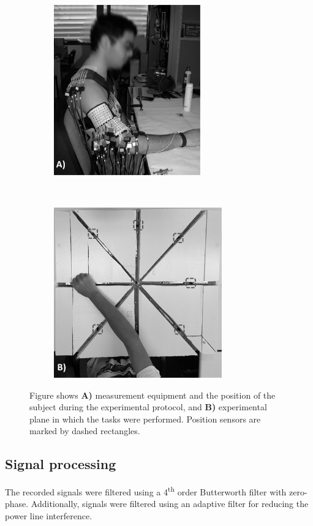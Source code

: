 \begin{figure}[t!]
    \centering
    \begin{subfigure}[t]{0.45\textwidth}
        \centering
        \includegraphics[height=2.9in]{Images/figure4_1a.png}
   
    \end{subfigure}%
    ~ 
    \begin{subfigure}[t]{0.45\textwidth}
        \centering
        \includegraphics[height=2.9in]{Images/figure4_1b.png}
        
    \end{subfigure}
    \caption{Figure shows \textbf{A)} measurement equipment and the position of the subject during the experimental protocol, and \textbf{B)} experimental plane in which the tasks were performed. Position sensors are marked by dashed rectangles.}
\label{fig:4-1}
\end{figure}


\subsection{Signal processing}
The recorded signals were filtered using a 4\textsuperscript{th} order Butterworth filter with zero-phase. Additionally, signals were filtered using an adaptive filter for reducing the power line interference.

